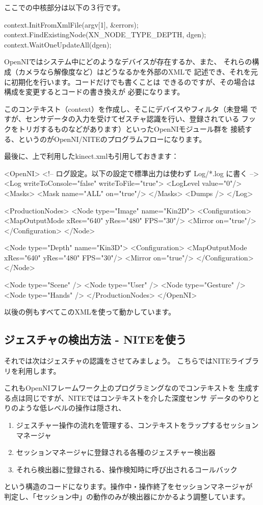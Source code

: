 \documentclass[mingoth,a4paper]{jsarticle}
\begin{document}
ここでの中核部分は以下の３行です。
\begin{commandline}
context.InitFromXmlFile(argv[1], &errors);
context.FindExistingNode(XN_NODE_TYPE_DEPTH, dgen);
context.WaitOneUpdateAll(dgen);
\end{commandline}

OpenNIではシステム中にどのようなデバイスが存在するか、また、
それらの構成（カメラなら解像度など）はどうなるかを外部のXMLで
記述でき、それを元に初期化を行います。コードだけでも書くことは
できるのですが、その場合は構成を変更するとコードの書き換えが
必要になります。

このコンテキスト（context）を作成し、そこにデバイスやフィルタ（未登場
ですが、センサデータの入力を受けてゼスチャ認識を行い、登録されている
フックをトリガするものなどがあります）といったOpenNIモジュール群を
接続する、というのがOpenNI/NITEのプログラムフローになります。

最後に、上で利用したkinect.xmlも引用しておきます：
\begin{commandline}
<OpenNI>
  <!-- ログ設定。以下の設定で標準出力は使わず Log/*.log に書く -->
  <Log writeToConsole="false" writeToFile="true">
    <LogLevel value="0"/>
    <Masks>
      <Mask name="ALL" on="true"/>
    </Masks>
    <Dumps />
  </Log>

  <ProductionNodes>
    <Node type="Image" name="Kin2D">
      <Configuration>
        <MapOutputMode xRes="640" yRes="480" FPS="30"/>
        <Mirror on="true"/>
      </Configuration>
    </Node>

    <Node type="Depth" name="Kin3D">
      <Configuration>
        <MapOutputMode xRes="640" yRes="480" FPS="30"/>
        <Mirror on="true"/>
      </Configuration>
    </Node>

    <Node type="Scene" />
    <Node type="User" />
    <Node type="Gesture" />
    <Node type="Hands" />
  </ProductionNodes>
</OpenNI>
\end{commandline}
以後の例もすべてこのXMLを使って動かしています。

\subsection{ジェスチャの検出方法 - NITEを使う}
それでは次はジェスチャの認識をさせてみましょう。
こちらではNITEライブラリを利用します。

これもOpenNIフレームワーク上のプログラミングなのでコンテキストを
生成する点は同じですが、NITEではコンテキストを介した深度センサ
データのやりとりのような低レベルの操作は隠され、
\begin{enumerate}
\item ジェスチャー操作の流れを管理する、コンテキストをラップするセッションマネージャ
\item セッションマネージャに登録される各種のジェスチャー検出器
\item それら検出器に登録される、操作検知時に呼び出されるコールバック
\end{enumerate}
という構造のコードになります。操作中・操作終了をセッションマネージャが
判定し、「セッション中」の動作のみが検出器にかかるよう調整しています。
\end{document}
